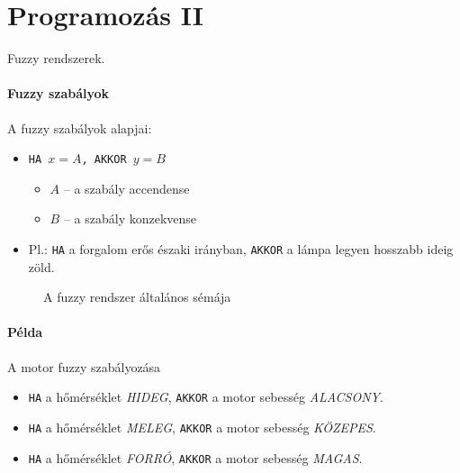 \documentclass[../../main.tex]{subfiles}
\begin{document}
\section{Programozás II}

\begin{fulltheorem}
  Fuzzy rendszerek.
\end{fulltheorem}


\paragraph{Fuzzy szabályok} A fuzzy szabályok alapjai:
\begin{itemize}
  \item \texttt{HA $x = A$, AKKOR $y = B$}
        \begin{itemize}
          \item $A$ -- a szabály accendense
          \item $B$ -- a szabály konzekvense
        \end{itemize}
  \item Pl.: \texttt{HA} a forgalom erős északi irányban,
        \texttt{AKKOR} a lámpa legyen hosszabb ideig zöld.
\end{itemize}

\begin{figure}[htb]
  \centering
  \caption{A fuzzy rendszer általános sémája}
  \label{fig:fuzzy-scheme}
\end{figure}

\paragraph{Példa} A motor fuzzy szabályozása
\begin{itemize}
  \item \texttt{HA} a hőmérséklet \textit{HIDEG},
        \texttt{AKKOR} a motor sebesség \textit{ALACSONY}.
  \item \texttt{HA} a hőmérséklet \textit{MELEG},
        \texttt{AKKOR} a motor sebesség \textit{KÖZEPES}.
  \item \texttt{HA} a hőmérséklet \textit{FORRÓ},
        \texttt{AKKOR} a motor sebesség \textit{MAGAS}.
\end{itemize}
\end{document}

